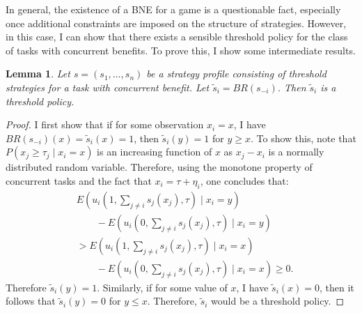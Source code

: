 \documentclass[defaultstyle,12pt]{thesis}
\newtheorem{lemma}{Lemma}
\begin{document}
In general, the existence of a BNE for a game is a questionable fact, especially once additional constraints are imposed on the structure of strategies. However, in this case, I can show that there exists a sensible threshold policy for the class of tasks with concurrent benefits. To prove this, I show some intermediate results. 
\begin{lemma}\label{lemma:thresholdBR}
Let $s=(s_1,\ldots,s_n)$ be a strategy profile consisting of threshold strategies for a task with concurrent benefit. Let $\tilde{s}_i=BR(s_{-i})$. Then $\tilde{s}_i$ is a threshold policy. 
\end{lemma}
\begin{proof}
I first show that if for some observation $x_i=x$, I have $BR(s_{-i})(x)=\tilde{s}_i(x)=1$, then $\tilde{s}_i(y)=1$ for $y\geq x$. To show this,  note that $P(x_j\geq \tau_j\mid x_i=x)$ is an increasing function of $x$ as $x_j-x_i$ is a normally distributed random variable. Therefore, using the monotone property of concurrent tasks and the fact that $x_i=\tau+\eta_i$, one concludes that:
\vspace{-5px}
\begin{align*}
&E(u_i(1,\sum_{j\not=i}s_j(x_j),\tau)\mid x_i=y)\\ 
&\qquad-E(u_i(0,\sum_{j\not=i}s_j(x_j),\tau)\mid x_i=y)\\ 
&>E(u_i(1,\sum_{j\not=i}s_j(x_j),\tau)\mid x_i=x)\\
&\qquad-E(u_i(0,\sum_{j\not=i}s_j(x_j),\tau)\mid x_i=x)\geq 0.
\end{align*}
Therefore $\tilde{s}_i(y)=1$. Similarly, if for some value of $x$, I have $\tilde{s}_i(x)=0$, then it follows that $\tilde{s}_i(y)=0$ for $y\leq x$. Therefore, $\tilde{s}_i$ would be a threshold policy.  
\end{proof}
\end{document}
